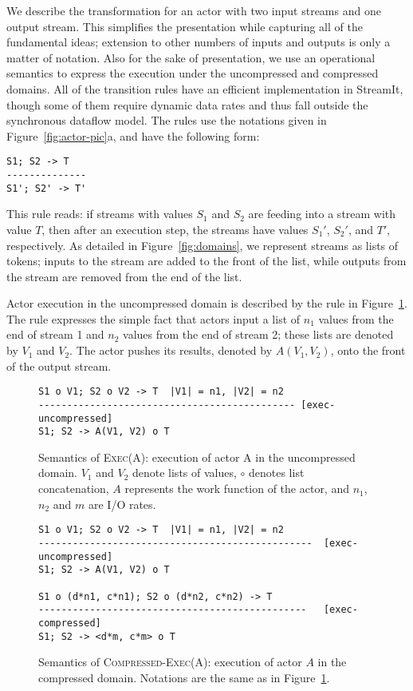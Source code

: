 We describe the transformation for an actor with two input streams and
one output stream.  This simplifies the presentation while capturing
all of the fundamental ideas; extension to other numbers of inputs and
outputs is only a matter of notation.  Also for the sake of
presentation, we use an operational semantics to express the execution
under the uncompressed and compressed domains.  All of the transition
rules have an efficient implementation in StreamIt, though some of
them require dynamic data rates and thus fall outside the synchronous
dataflow model.  The rules use the notations given in
Figure~\ref{fig:actor-pic}a, and have the following form:

{\scriptsize
\begin{verbatim}
S1; S2 -> T
--------------
S1'; S2' -> T'
\end{verbatim}}
This rule reads: if streams with values $S_1$ and $S_2$ are feeding
into a stream with value $T$, then after an execution step, the
streams have values $S_1'$, $S_2'$, and $T'$, respectively.  As
detailed in Figure~\ref{fig:domains}, we represent streams as lists of
tokens; inputs to the stream are added to the front of the list, while
outputs from the stream are removed from the end of the list.

Actor execution in the uncompressed domain is described by the rule in
Figure~\ref{fig:exec-rule}.  The rule expresses the simple fact that
actors input a list of $n_1$ values from the end of stream 1 and $n_2$
values from the end of stream 2; these lists are denoted by $V_1$ and
$V_2$.  The actor pushes its results, denoted by $A(V_1, V_2)$, onto
the front of the output stream.

\begin{figure}[t]
\scriptsize
\begin{verbatim}
S1 o V1; S2 o V2 -> T  |V1| = n1, |V2| = n2
--------------------------------------------- [exec-uncompressed]
S1; S2 -> A(V1, V2) o T
\end{verbatim}
\caption{Semantics of \textsc{Exec(A)}: execution of actor A in the
uncompressed domain.  $V_1$ and $V_2$ denote lists of values, $\circ$
denotes list concatenation, $A$ represents the work function of the
actor, and $n_1$, $n_2$ and $m$ are I/O rates.
\protect\label{fig:exec-rule}}
\end{figure}

\begin{figure}[t]
\scriptsize
\begin{verbatim}
S1 o V1; S2 o V2 -> T  |V1| = n1, |V2| = n2
------------------------------------------------  [exec-uncompressed]
S1; S2 -> A(V1, V2) o T

S1 o (d*n1, c*n1); S2 o (d*n2, c*n2) -> T
-----------------------------------------------   [exec-compressed]
S1; S2 -> <d*m, c*m> o T
\end{verbatim}
\caption{Semantics of \textsc{Compressed-Exec(A)}: execution of actor
$A$ in the compressed domain.  Notations are the same as in
Figure~\ref{fig:exec-rule}.  \protect\label{fig:compressed-exec-rule}}
\end{figure}

